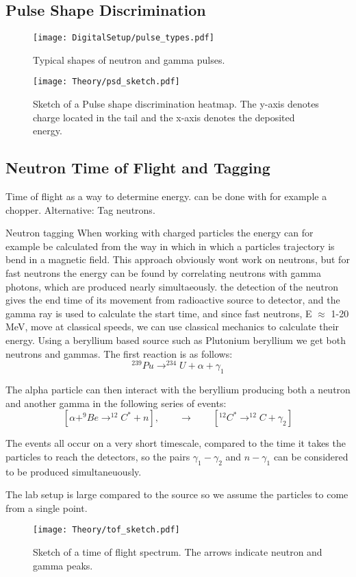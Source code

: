 \documentclass[main.tex]{subfiles}
\begin{document}
\subsection{Pulse Shape Discrimination}
\begin{figure}[ht]
	\centering
    	\texttt{[image: DigitalSetup/pulse\_types.pdf]}
        \caption{Typical shapes of neutron and gamma pulses.}
	    \label{fig:pulse_types} 
\end{figure}
\begin{figure}[ht]
    \centering
        \texttt{[image: Theory/psd\_sketch.pdf]}
        \caption{Sketch of a Pulse shape discrimination heatmap. The y-axis denotes charge located in the tail and the x-axis denotes the deposited energy.}
    \label{fig:psd_sketch} 
\end{figure}

\subsection{Neutron Time of Flight and Tagging}
Time of flight as a way to determine energy. can be done with for example a chopper.
Alternative: Tag neutrons.

Neutron tagging
When working with charged particles the energy can for example be calculated from the way in which in which a particles trajectory is bend in a magnetic field. This approach obviously wont work on neutrons, but for fast neutrons the energy can be found by correlating neutrons with gamma photons, which are produced nearly simultaeously. the detection of the neutron gives the end time of its movement from radioactive source to detector, and the gamma ray is used to calculate the start time, and since fast neutrons, E $\approx$ 1-20 MeV, move at classical speeds, we can use classical mechanics to calculate their energy. 
Using a beryllium based source such as Plutonium beryllium we get both neutrons and gammas. The first reaction is as follows: $$^{239}Pu\rightarrow^{234}U+\alpha+\gamma_1$$

The alpha particle can then interact with the beryllium producing both a neutron and another gamma in the following series of events: $$[\alpha+^{9}Be\rightarrow^{12}C^{*}+n],\qquad \longrightarrow \qquad [^{12}C^ {*}\rightarrow^{12}C+\gamma_2]$$

The events all occur on a very short timescale, compared to the time it takes the particles to reach the detectors, so the pairs $\gamma_1-\gamma_2$ and $n-\gamma_1$ can be considered to be produced simultaneuously. %

The lab setup is large compared to the source so we assume the particles to come from a single point.
\begin{figure}[ht]
    \centering
        \texttt{[image: Theory/tof\_sketch.pdf]}
        \caption{Sketch of a time of flight spectrum. The arrows indicate neutron and gamma peaks.}
    \label{fig:tof_sketch} 
\end{figure}
\end{document}
